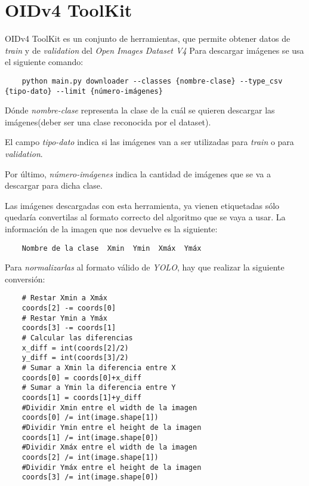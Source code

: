 \clearpage

\section{OIDv4 ToolKit}
OIDv4 ToolKit \cite{OIDv4TK} es un conjunto de herramientas, que permite obtener datos de \textit{train} y de \textit{validation} del \textit{Open Images Dataset V4} 
Para descargar imágenes se usa el siguiente comando:
\tiny \begin{verbatim}
    python main.py downloader --classes {nombre-clase} --type_csv {tipo-dato} --limit {número-imágenes}
\end{verbatim} 
\normalsize

Dónde \textit{nombre-clase} representa la clase de la cuál se quieren descargar las imágenes(deber ser una clase reconocida por el dataset). 

El campo \textit{tipo-dato} indica si las imágenes van a ser utilizadas para \textit{train} o para \textit{validation}.

Por último, \textit{número-imágenes} indica la cantidad de imágenes que se va a descargar para dicha clase.

Las imágenes descargadas con esta herramienta, ya vienen etiquetadas sólo quedaría convertilas al formato correcto del algoritmo que se vaya a usar. La información de la imagen que nos devuelve es la siguiente:
\begin{verbatim}
    Nombre de la clase  Xmin  Ymin  Xmáx  Ymáx
\end{verbatim}
Para \textit{normalizarlas} al formato válido de \textit{YOLO}, hay que realizar la siguiente conversión:    
\begin{verbatim}
    # Restar Xmin a Xmáx
    coords[2] -= coords[0]
    # Restar Ymin a Ymáx
    coords[3] -= coords[1]
    # Calcular las diferencias
    x_diff = int(coords[2]/2)
    y_diff = int(coords[3]/2)
    # Sumar a Xmin la diferencia entre X
    coords[0] = coords[0]+x_diff
    # Sumar a Ymin la diferencia entre Y
    coords[1] = coords[1]+y_diff
    #Dividir Xmin entre el width de la imagen
    coords[0] /= int(image.shape[1])
    #Dividir Ymin entre el height de la imagen
    coords[1] /= int(image.shape[0])
    #Dividir Xmáx entre el width de la imagen
    coords[2] /= int(image.shape[1])
    #Dividir Ymáx entre el height de la imagen
    coords[3] /= int(image.shape[0])
\end{verbatim}

